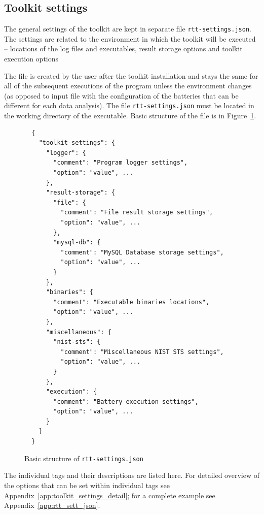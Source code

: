 \documentclass[
	digital,    %
	oneside,    %
	color,
	11pt,
	nocover,
	notable,
	nolof,
	nolot,
]{fithesis3}
\theoremstyle{definition}
\theoremstyle{remark}
\begin{document}
\subsection{Toolkit settings}
The general settings of the toolkit are kept in separate file \texttt{rtt-settings.json}. The settings are related to the environment in which the toolkit will be executed -- locations of the log files and executables, result storage options and toolkit execution options 

The file is created by the user after the toolkit installation and stays the same for all of the subsequent executions of the program unless the environment changes (as opposed to input file with the configuration of the batteries that can be different for each data analysis). The file \texttt{rtt-settings.json} must be located in the working directory of the executable. Basic structure of the file is in Figure~\ref{fig:rtt_sett_short_json}.

\begin{figure}[h!]
\begin{verbatim}
  {
    "toolkit-settings": {
      "logger": {
        "comment": "Program logger settings",
        "option": "value", ...
      },
      "result-storage": {
        "file": {
          "comment": "File result storage settings",
          "option": "value", ...
        },
        "mysql-db": {
          "comment": "MySQL Database storage settings",
          "option": "value", ...
        }
      },
      "binaries": {
        "comment": "Executable binaries locations",
        "option": "value", ...
      },    
      "miscellaneous": {
        "nist-sts": {
          "comment": "Miscellaneous NIST STS settings",
          "option": "value", ...
        }
      },
      "execution": {
        "comment": "Battery execution settings",
        "option": "value", ...
      }
    }
  }
\end{verbatim}
\caption{Basic structure of \texttt{rtt-settings.json}}
\label{fig:rtt_sett_short_json}
\end{figure}

The individual tags and their descriptions are listed here. For detailed overview of the options that can be set within individual tags see Appendix~\ref{app:toolkit_settings_detail}; for a complete example see Appendix~\ref{app:rtt_sett_json}. 
\end{document}
